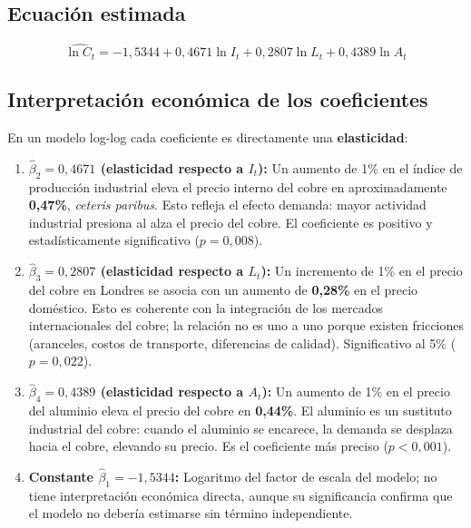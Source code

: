 \documentclass[12pt,a4paper]{article}
\begin{document}
\subsection{Ecuación estimada}

\begin{equation}
  \widehat{\ln C_t} = -1{,}5344 + 0{,}4671\ln I_t + 0{,}2807\ln L_t + 0{,}4389\ln A_t
  \label{eq:estimada}
\end{equation}

\subsection{Interpretación económica de los coeficientes}

En un modelo log-log cada coeficiente es directamente una \textbf{elasticidad}:

\begin{enumerate}
  \item \textbf{$\hat{\beta}_2 = 0{,}4671$ (elasticidad respecto a $I_t$):}
    Un aumento de 1\% en el índice de producción industrial eleva el precio
    interno del cobre en aproximadamente \textbf{0,47\%}, \textit{ceteris paribus}.
    Esto refleja el efecto demanda: mayor actividad industrial presiona al alza
    el precio del cobre. El coeficiente es positivo y estadísticamente
    significativo ($p=0{,}008$).

  \item \textbf{$\hat{\beta}_3 = 0{,}2807$ (elasticidad respecto a $L_t$):}
    Un incremento de 1\% en el precio del cobre en Londres se asocia con un
    aumento de \textbf{0,28\%} en el precio doméstico. Esto es coherente con
    la integración de los mercados internacionales del cobre; la relación no es
    uno a uno porque existen fricciones (aranceles, costos de transporte,
    diferencias de calidad). Significativo al 5\% ($p=0{,}022$).

  \item \textbf{$\hat{\beta}_4 = 0{,}4389$ (elasticidad respecto a $A_t$):}
    Un aumento de 1\% en el precio del aluminio eleva el precio del cobre en
    \textbf{0,44\%}. El aluminio es un sustituto industrial del cobre:
    cuando el aluminio se encarece, la demanda se desplaza hacia el cobre,
    elevando su precio. Es el coeficiente más preciso ($p<0{,}001$).

  \item \textbf{Constante $\hat{\beta}_1 = -1{,}5344$:}
    Logaritmo del factor de escala del modelo; no tiene interpretación
    económica directa, aunque su significancia confirma que el modelo no
    debería estimarse sin término independiente.
\end{enumerate}
\end{document}
